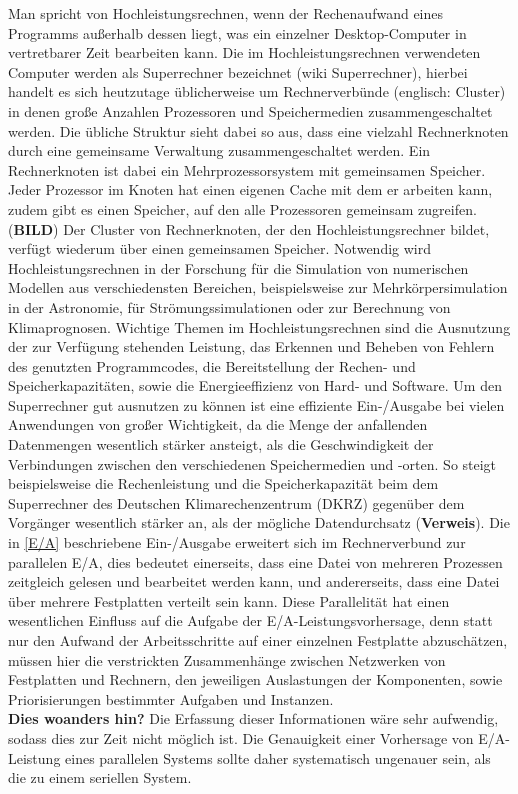 \documentclass[
	12pt,
	a4paper,
	BCOR10mm,
	DIV14,
	listof=totoc,
	bibliography=totoc,
	headsepline
]{scrreprt}
\begin{document}
Man spricht von Hochleistungsrechnen, wenn der Rechenaufwand eines Programms außerhalb dessen liegt, was ein einzelner Desktop-Computer in vertretbarer Zeit bearbeiten kann.
Die im Hochleistungsrechnen verwendeten Computer werden als Superrechner bezeichnet (wiki Superrechner), hierbei handelt es sich heutzutage üblicherweise um Rechnerverbünde (englisch: Cluster) in denen große Anzahlen Prozessoren und Speichermedien zusammengeschaltet werden. Die übliche Struktur sieht dabei so aus, dass eine vielzahl Rechnerknoten durch eine gemeinsame Verwaltung zusammengeschaltet werden. Ein Rechnerknoten ist dabei ein Mehrprozessorsystem mit gemeinsamen Speicher. Jeder Prozessor im Knoten hat einen eigenen Cache mit dem er arbeiten kann, zudem gibt es einen Speicher, auf den alle Prozessoren gemeinsam zugreifen. (\textbf{BILD}) Der Cluster von Rechnerknoten, der den Hochleistungsrechner bildet, verfügt wiederum über einen gemeinsamen Speicher.
Notwendig wird Hochleistungsrechnen in der Forschung für die Simulation von numerischen Modellen aus verschiedensten Bereichen, beispielsweise zur Mehrkörpersimulation in der Astronomie, für Strömungssimulationen oder zur Berechnung von Klimaprognosen.
Wichtige Themen im Hochleistungsrechnen sind die Ausnutzung der zur Verfügung stehenden Leistung, das Erkennen und Beheben von Fehlern des genutzten Programmcodes, die Bereitstellung der Rechen- und Speicherkapazitäten, sowie die Energieeffizienz von Hard- und Software.
Um den Superrechner gut ausnutzen zu können ist eine effiziente Ein-/Ausgabe bei vielen Anwendungen von großer Wichtigkeit, da die Menge der anfallenden Datenmengen wesentlich stärker ansteigt, als die Geschwindigkeit der Verbindungen zwischen den verschiedenen Speichermedien und -orten. So steigt beispielsweise die Rechenleistung und die Speicherkapazität beim dem Superrechner des Deutschen Klimarechenzentrum (DKRZ) gegenüber dem Vorgänger wesentlich stärker an, als der mögliche Datendurchsatz (\textbf{Verweis}).
Die in \ref{E/A} beschriebene Ein-/Ausgabe erweitert sich im Rechnerverbund zur parallelen E/A, dies bedeutet einerseits, dass eine Datei von mehreren Prozessen zeitgleich gelesen und bearbeitet werden kann, und andererseits, dass eine Datei über mehrere Festplatten verteilt sein kann. Diese Parallelität hat einen wesentlichen Einfluss auf die Aufgabe der E/A-Leistungsvorhersage, denn statt nur den Aufwand der Arbeitsschritte auf einer einzelnen Festplatte abzuschätzen, müssen hier die verstrickten Zusammenhänge zwischen Netzwerken von Festplatten und Rechnern, den jeweiligen Auslastungen der Komponenten, sowie Priorisierungen bestimmter Aufgaben und Instanzen.\\
\textbf{Dies woanders hin?}
Die Erfassung dieser Informationen wäre sehr aufwendig, sodass dies zur Zeit nicht möglich ist. Die Genauigkeit einer Vorhersage von E/A-Leistung eines parallelen Systems sollte daher systematisch ungenauer sein, als die zu einem seriellen System.
\end{document}
